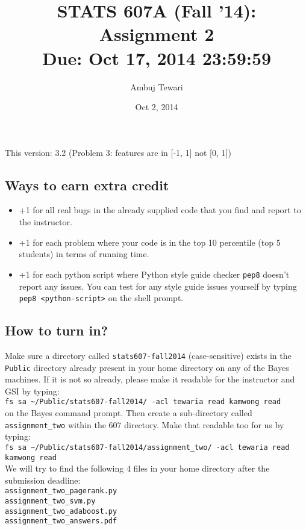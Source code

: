 \documentclass{article}
\begin{document}
\author{Ambuj Tewari}
\title{STATS 607A (Fall '14): Assignment 2\\
Due: Oct 17, 2014 23:59:59}
\date{Oct 2, 2014}

\maketitle

\begin{center}
This version: 3.2 (Problem 3: features are in [-1, 1] not [0, 1])
\end{center}

\subsection*{Ways to earn extra credit}

\begin{itemize}
\item +1 for all real bugs in the already supplied code that you find and report to the instructor.
\item +1 for each problem where your code is in the top 10 percentile (top 5 students) in terms of running time.
\item +1 for each python script where Python style guide checker {\tt pep8} doesn't report any issues. You can test for any style guide issues yourself by typing
{\tt pep8 <python-script>} on the shell prompt.

\end{itemize}

\subsection*{How to turn in?}

Make sure a directory called {\tt stats607-fall2014} (case-sensitive) exists in the {\tt Public} directory already present in your home directory on any of the Bayes machines.
If it is not so already, please make it readable for the instructor and GSI by typing:\\
\verb#fs sa ~/Public/stats607-fall2014/ -acl tewaria read kamwong read# \\
on the Bayes command prompt. Then create a sub-directory called {\tt assignment\_two} within the 607 directory. Make that readable too for us by typing:\\
\verb#fs sa ~/Public/stats607-fall2014/assignment_two/ -acl tewaria read kamwong read# \\
We will try to find the
following 4 files in your home directory after the submission deadline:\\
{\tt assignment\_two\_pagerank.py} \\
{\tt assignment\_two\_svm.py} \\
{\tt assignment\_two\_adaboost.py} \\
{\tt assignment\_two\_answers.pdf} \\
\end{document}
